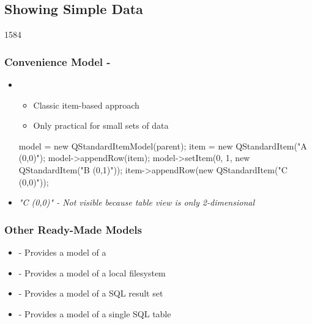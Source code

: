%
%
%
%

\subsection{Showing Simple Data}


\begin{slide}[fragile]{1584}\frametitle{Convenience Model - }
  \begin{itemize}
  \item {}
    \begin{itemize}
   \item Classic item-based approach
    \item Only practical for small sets of data
 \end{itemize}
   \begin{cpp}
model = new QStandardItemModel(parent);
item = new QStandardItem("A (0,0)");
model->appendRow(item);
model->setItem(0, 1, new QStandardItem("B (0,1)"));
item->appendRow(new QStandardItem("C (0,0)"));
\end{cpp}
\item \textit{"C (0,0)" - Not visible because table view is only 2-dimensional}
\end{itemize}
\end{slide}

\begin{slide}\frametitle{Other Ready-Made Models}
\begin{itemize}
\item {} - Provides a model of a 
\item {} - Provides a model of a local filesystem
\item {} - Provides a model of a SQL result set
\item {} - Provides a model of a single SQL table
\end{itemize}
\end{slide}



